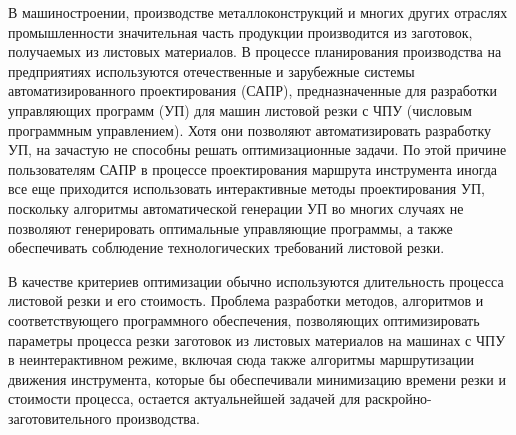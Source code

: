 
В машиностроении, производстве металлоконструкций и
многих других отраслях промышленности значительная часть продукции
производится из заготовок, получаемых из листовых материалов.
В процессе планирования производства
на предприятиях используются отечественные и зарубежные
системы автоматизированного проектирования (САПР),
предназначенные для разработки управляющих программ (УП)
для машин листовой резки с ЧПУ
(числовым программным управлением).
Хотя они позволяют автоматизировать разработку УП,
на зачастую не способны решать оптимизационные задачи.
По этой причине
пользователям САПР
в процессе проектирования маршрута инструмента
иногда все еще приходится использовать интерактивные методы проектирования УП,
поскольку алгоритмы автоматической генерации УП
во многих случаях не позволяют генерировать
оптимальные управляющие программы,
а также обеспечивать соблюдение технологических требований листовой резки.

В качестве критериев
оптимизации обычно используются длительность процесса листовой резки и его стоимость.
Проблема разработки методов, алгоритмов
и соответствующего программного обеспечения,
позволяющих оптимизировать параметры процесса резки заготовок
из листовых материалов на машинах с ЧПУ
в неинтерактивном режиме,
включая сюда также алгоритмы маршрутизации движения инструмента,
которые бы обеспечивали минимизацию времени резки и стоимости процесса,
остается актуальнейшей задачей для раскройно-заготовительного производства.
